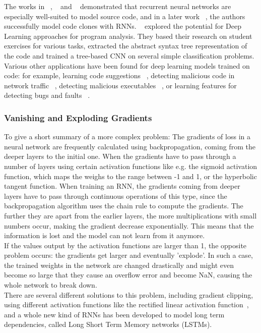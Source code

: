 \documentclass[
	a4paper,
	pagesize,
	pdftex,
	12pt,
	twoside, %
	BCOR=5mm, %
	ngerman,
	fleqn,
	final,
	]{scrartcl}
\begin{document}
The works in ~\cite{White.2015}, ~\cite{Dam.2016b} and ~\cite{Dam.2016} demonstrated that recurrent neural networks are especially well-suited to model source code, and in a later work ~\cite{White.2016}, the authors successfully model code clones with RNNs. ~\cite{Mou.2014} explored the potential for Deep Learning approaches for program analysis. They based their research on student exercises for various tasks, extracted the abstract syntax tree representation of the code and trained a tree-based CNN on several simple classification problems. Various other applications have been found for deep learning models trained on code: for example, learning code suggestions ~\cite{Bhoopchand.2016}, detecting malicious code in network traffic ~\cite{Elovici.2007}, detecting malicious executables ~\cite{Schultz.2000}, or learning features for detecting bugs and faults ~\cite{Huo.2016,Gupta.2017b}. 

\subsubsection{Vanishing and Exploding Gradients}
To give a short summary of a more complex problem: The gradients of loss in a neural network are frequently calculated using backpropagation, coming from the deeper layers to the initial one. When the gradients have to pass through a number of layers using certain activation functions like e.g. the sigmoid activation function, which maps the weighs to the range between -1 and 1, or the hyperbolic tangent function. When training an RNN, the gradients coming from deeper layers have to pass through continuous operations of this type, since the backpropagation algorithm uses the chain rule to compute the gradients. The further they are apart from the earlier layers, the more multiplications with small numbers occur, making the gradient decrease exponentially. This means that the information is lost and the model can not learn from it anymore.\\
If the values output by the activation functions are larger than 1, the opposite problem occurs: the gradients get larger and eventually 'explode'. In such a case, the trained weights in the network are changed drastically and might even become so large that they cause an overflow error and become NaN, causing the whole network to break down.\\ %
There are several different solutions to this problem, including gradient clipping, using different activation functions like the rectified linear activation function~\cite{Glorot.2011}, and a whole new kind of RNNs has been developed to model long term dependencies, called Long Short Term Memory networks (LSTMs).
\end{document}
